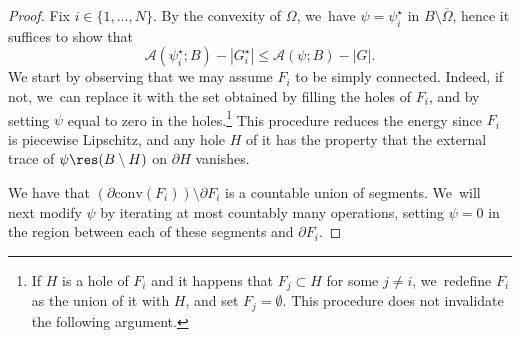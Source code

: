\begin{proof}
Fix $i\in\{1,\dots,N\}$.
By the convexity of $\Omega$, we~have $\psi=\psi_i^\star$ in $B\setminus \overline\Omega$, hence it suffices to show that
\begin{equation*}
\mathcal A(\psi_i^\star;B)-|G_i^\star|\leq\mathcal A(\psi;B)-|G|.
\end{equation*}
We start by observing that we may assume $F_i$ to be simply connected.
Indeed, if not, we~can replace it with the set obtained by filling the
holes of $F_i$, and by setting $\psi$ equal to zero in the holes.\footnote{If $H$ is a hole of $F_i$ and it happens that $F_j\subset H$ for some $j\neq i$, we~redefine $F_i$ as the union of it with $H$, and set $F_j=\emptyset$. This procedure does not invalidate the following argument.}
This procedure reduces the energy since $F_i$ is piecewise Lipschitz, and any hole $H$ of
it has the property that
the external trace of $\psi\res (B\setminus H)$ on $\partial H$ vanishes.

We have that $(\partial \mathrm{conv}(F_i))\setminus\partial F_i$ is a countable union of segments. We~will next modify $\psi$ by iterating at most countably many operations, setting $\psi=0$ in the region between each of these segments and $\partial F_i$.


\end{proof}
